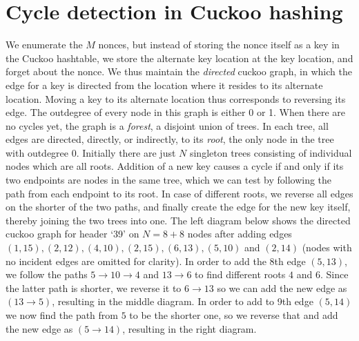 \documentclass[11pt, oneside]{article}
\begin{document}
\section{Cycle detection in Cuckoo hashing}
We enumerate the $M$ nonces, but instead of storing the nonce itself as a key
in the Cuckoo hashtable, we store the alternate key location at the key
location, and forget about the nonce.  We thus maintain the {\em directed}
cuckoo graph, in which the edge for a key is directed from the location where
it resides to its alternate location.  Moving a key to its alternate location
thus corresponds to reversing its edge.  The outdegree of every node in this
graph is either 0 or 1.  When there are no cycles yet, the graph is a {\em
forest}, a disjoint union of trees.  In each tree, all edges are directed,
directly, or indirectly, to its {\em root}, the only node in the tree with
outdegree 0.  Initially there are just $N$ singleton trees consisting of
individual nodes which are all roots.
Addition of a new key causes a cycle if and only if its two endpoints are
nodes in the same tree, which we can test by following the path from each
endpoint to its root.
In case of different roots, we reverse all edges on the shorter of the two
paths, and finally create the edge for the new key itself, thereby joining
the two trees into one.
The left diagram below shows the directed cuckoo graph for header `39' on
$N=8+8$ nodes after adding edges
$(1,15),(2,12),(4,10),(2,15),(6,13),(5,10)$ and $(2,14)$ (nodes
with no incident edges are omitted for clarity).
In order to add the 8th edge $(5,13)$, we follow the paths $5 \rightarrow 10
\rightarrow 4$ and $13 \rightarrow 6$ to find different roots $4$ and $6$.
Since the latter path is shorter, we reverse it to $6 \rightarrow 13$ so we
can add the new edge as $(13 \rightarrow 5)$, resulting in the middle diagram.
In order to add to 9th edge
$(5,14)$ we now find the path from $5$ to be the shorter one, so we reverse
that and add the new edge as $(5 \rightarrow 14)$, resulting in the right diagram.
\end{document}
